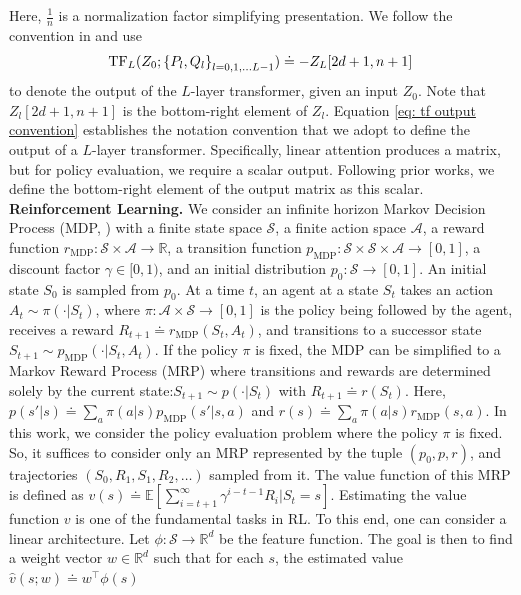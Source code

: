 \documentclass{article}
\newcommand{\newtext}[1]{{#1}}
\newcommand{\fS}{\mathcal{S}}
\newcommand{\fA}{\mathcal{A}}
\newcommand{\R}{\mathbb{R}}
\newcommand{\E}{\mathbb{E}}
\newcommand{\tb}[1]{{\textbf{#1}}}
\newcommand{\tf}{\text{TF}}
\newcommand{\mdp}{\text{MDP}}
\begin{document}
Here, $\frac{1}{n}$ is a normalization factor simplifying presentation.
We follow the convention in \citet{vonoswald2023transformers,ahn2024transformers} and use
\begin{align}
    \textstyle \tf_L(Z_0; \qty{P_l, Q_l}_{l=0,1,\dots L-1} ) \doteq -Z_L[2d+1, n+1] \label{eq: tf output convention}
\end{align}
to denote the output of the $L$-layer transformer,
given an input $Z_0$. Note that $Z_l[2d+1, n+1]$ is the bottom-right element of $Z_l$. \newtext{Equation \eqref{eq: tf output convention} establishes the notation convention that we adopt to define the output of a $L$-layer transformer. Specifically, linear attention produces a matrix, but for policy evaluation, we require a scalar output. Following prior works, we define the bottom-right element of the output matrix as this scalar.}
\tb{Reinforcement Learning.}
We consider an infinite horizon Markov Decision Process (MDP, \citet{puterman2014markov}) with a finite state space $\fS$,
a finite action space $\fA$,
a reward function $r_\mdp: \fS \times \fA \to \R$,
a transition function $p_\mdp: \fS \times \fS \times \fA \to [0, 1]$,
a discount factor $\gamma \in [0, 1)$,
and an initial distribution $p_0: \fS \to [0, 1]$.
An initial state $S_0$ is sampled from $p_0$.
At a time $t$,
an agent at a state $S_t$
 takes an action $A_t \sim \pi(\cdot | S_t)$,
where $\pi: \fA \times \fS \to [0, 1]$ is the policy being followed by the agent,
receives a reward $R_{t+1} \doteq r_\mdp(S_t, A_t)$,
and transitions to a successor state $S_{t+1} \sim p_\mdp(\cdot | S_t, A_t)$.
If the policy $\pi$ is fixed, the MDP can be simplified to a Markov Reward Process (MRP) where transitions and rewards are determined solely by the current state:$S_{t+1} \sim p(\cdot | S_t)$ with $R_{t+1} \doteq r(S_t)$.
Here, $p(s' | s) \doteq \sum_a \pi(a | s) p_\mdp(s'|s, a)$ and $r(s) \doteq \sum_a \pi(a|s) r_\mdp(s, a)$.
In this work,
we consider the policy evaluation problem where the policy $\pi$ is fixed.
So, it suffices to consider only
an MRP represented by the tuple $(p_0, p, r)$,
and trajectories $(S_0, R_1, S_1, R_2, \dots)$ sampled from it.
The value function of this MRP is defined as
    $
    v(s) \doteq \E\left[\sum_{i = t+1}^\infty \gamma^{i - t -1} R_i | S_t = s\right]
    $.
Estimating the value function $v$ is one of the fundamental tasks in RL.
To this end, one can consider a linear architecture.
Let $\phi: \fS \to \R^d$ be the feature function.
The goal is then to find a weight vector $w \in \R^d$ such that for each $s$, the estimated value $\hat{v}(s; w) \doteq w^\top \phi(s)$
\end{document}
